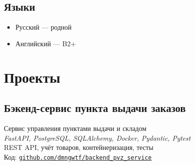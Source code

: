 \documentclass[a4paper,12pt]{article}
\begin{document}
	\subsection*{Языки}
	\begin{itemize}[leftmargin=1.5em]
		\item Русский — родной
		\item Английский — B2+
	\end{itemize}
	
	\vspace{10pt}
	
	
	
	
	\section*{Проекты}
	
	\subsection*{Бэкенд-сервис пункта выдачи заказов}
	Сервис управления пунктами выдачи и складом \\
	\textit{FastAPI, PostgreSQL, SQLAlchemy, Docker, Pydantic, Pytest}\\  
	REST API, учёт товаров, контейнеризация, тесты\\
	{Код: \href{https://github.com/dmngwtf/backend_pvz_service}{\texttt{github.com/dmngwtf/backend\_pvz\_service}}}

		
		
	
\end{document}
